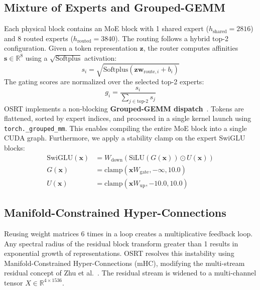 \documentclass[11pt,twocolumn]{article}
\begin{document}
\subsection{Mixture of Experts and Grouped-GEMM}
Each physical block contains an MoE block with 1 shared expert ($h_{\text{shared}}=2816$) and 8 routed experts ($h_{\text{routed}}=3840$). The routing follows a hybrid top-2 configuration. Given a token representation $\mathbf{z}$, the router computes affinities $\mathbf{s} \in \mathbb{R}^8$ using a $\sqrt{\text{Softplus}}$ activation:
\begin{equation}
s_i = \sqrt{\text{Softplus}(\mathbf{z} \mathbf{w}_{\text{route}, i} + b_i)}
\end{equation}
The gating scores are normalized over the selected top-2 experts:
\begin{equation}
g_i = \frac{s_i}{\sum_{j \in \text{top-2}} s_j}
\end{equation}
OSRT implements a non-blocking \textbf{Grouped-GEMM dispatch}~\cite{megablocks2022}. Tokens are flattened, sorted by expert indices, and processed in a single kernel launch using \texttt{torch.\_grouped\_mm}. This enables compiling the entire MoE block into a single CUDA graph. Furthermore, we apply a stability clamp on the expert SwiGLU blocks:
\begin{align}
\text{SwiGLU}(\mathbf{x}) &= W_{\text{down}} (\text{SiLU}(G(\mathbf{x})) \odot U(\mathbf{x})) \\
G(\mathbf{x}) &= \text{clamp}(\mathbf{x} W_{\text{gate}}, -\infty, 10.0) \\
U(\mathbf{x}) &= \text{clamp}(\mathbf{x} W_{\text{up}}, -10.0, 10.0)
\end{align}

\subsection{Manifold-Constrained Hyper-Connections}
Reusing weight matrices 6 times in a loop creates a multiplicative feedback loop. Any spectral radius of the residual block transform greater than 1 results in exponential growth of representations. OSRT resolves this instability using Manifold-Constrained Hyper-Connections (mHC), modifying the multi-stream residual concept of Zhu et al.~\cite{zhu2024}. The residual stream is widened to a multi-channel tensor $X \in \mathbb{R}^{4 \times 1536}$.
\end{document}
